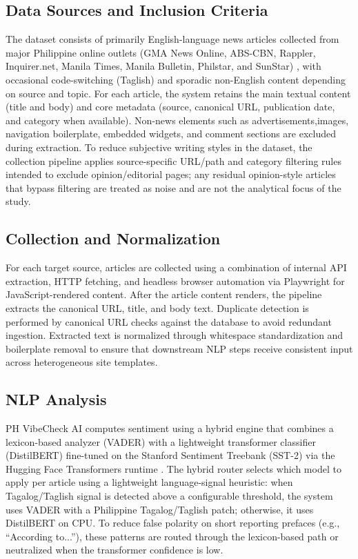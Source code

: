 \documentclass[sigconf, nonacm]{acmart}
\begin{document}
\subsection{Data Sources and Inclusion Criteria}
The dataset consists of primarily English-language news articles collected from major Philippine online outlets (GMA News Online, ABS-CBN, Rappler, Inquirer.net, Manila Times, Manila Bulletin, Philstar, and SunStar) \cite{gma_news,abscbn_news,rappler,inquirer_newsinfo,manila_times,manila_bulletin,philstar,sunstar}, with occasional code-switching (Taglish) and sporadic non-English content depending on source and topic. For each article, the system retains the main textual content (title and body) and core metadata (source, canonical URL, publication date, and category when available). Non-news elements such as advertisements,images, navigation boilerplate, embedded widgets, and comment sections are excluded during extraction. To reduce subjective writing styles in the dataset, the collection pipeline applies source-specific URL/path and category filtering rules intended to exclude opinion/editorial pages; any residual opinion-style articles that bypass filtering are treated as noise and are not the analytical focus of the study.

\subsection{Collection and Normalization}
For each target source, articles are collected using a combination of internal API extraction, HTTP fetching, and headless browser automation via Playwright \cite{playwright} for JavaScript-rendered content. After the article content renders, the pipeline extracts the canonical URL, title, and body text. Duplicate detection is performed by canonical URL checks against the database to avoid redundant ingestion. Extracted text is normalized through whitespace standardization and boilerplate removal to ensure that downstream NLP steps receive consistent input across heterogeneous site templates.

\subsection{NLP Analysis}
\label{subsec:nlp-analysis}
PH VibeCheck AI computes sentiment using a hybrid engine that combines a lexicon-based analyzer (VADER) \cite{hutto2014vader} with a lightweight transformer classifier (DistilBERT) \cite{sanh2019distilbert,devlin2018bert} fine-tuned on the Stanford Sentiment Treebank (SST-2) \cite{socher2013sst} via the Hugging Face Transformers runtime \cite{huggingface_transformers}. The hybrid router selects which model to apply per article using a lightweight language-signal heuristic: when Tagalog/Taglish signal is detected above a configurable threshold, the system uses VADER with a Philippine Tagalog/Taglish patch; otherwise, it uses DistilBERT on CPU. To reduce false polarity on short reporting prefaces (e.g., ``According to...''), these patterns are routed through the lexicon-based path or neutralized when the transformer confidence is low.
\end{document}

